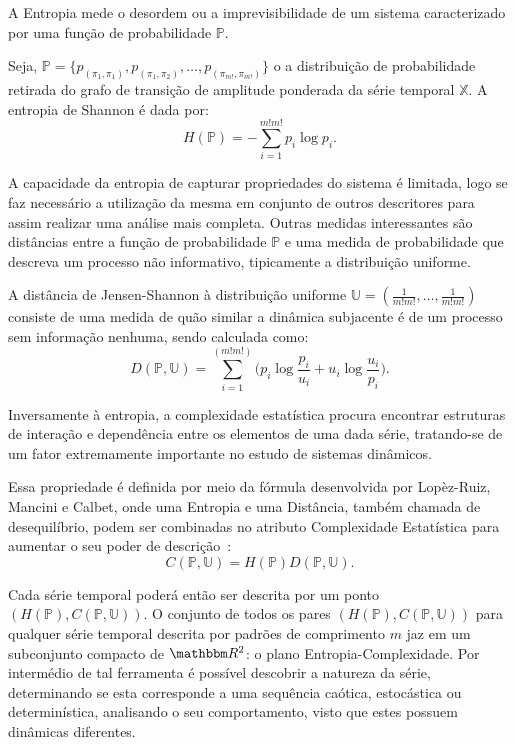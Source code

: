 \documentclass[12pt]{article}
\begin{document}
A Entropia mede o desordem ou a imprevisibilidade de um sistema caracterizado por uma função de probabilidade $\mathbb{P}$.

Seja, $\mathbb{P} = \{p_{(\pi_1, \pi_1)}, p_{(\pi_1, \pi_2)}, \dots, p_{(\pi_{m!}, \pi_{m!})}\}$ o a distribuição de probabilidade retirada do grafo de transição de amplitude ponderada da série temporal $\mathbb{X}$.
A entropia de Shannon é dada por:
\begin{equation}
H(\mathbb{P}) = -\sum_{i=1}^{m!m!} p_i \log p_i .
\label{eq:Entropia}
\end{equation}

A capacidade da entropia de capturar propriedades do sistema é limitada, logo se faz necessário a utilização da mesma em conjunto de outros descritores para assim realizar uma análise mais completa.
Outras medidas interessantes são distâncias entre a função de probabilidade $\mathbb{P}$ e uma medida de probabilidade que descreva um processo não informativo, tipicamente a distribuição uniforme.

A distância de Jensen-Shannon à distribuição uniforme $ \mathbb{U} = (\frac{1}{m!m!},\dots,\frac{1}{m!m!})$ consiste de uma medida de quão similar a dinâmica subjacente é de um processo sem informação nenhuma, sendo calculada como:
\begin{equation}
D(\mathbb{P}, \mathbb{U}) = \sum_{i=1}^{(m!m!)} \Big(p_i \log\frac{p_i}{u_i} +
u_i \log\frac{u_i}{p_i}
\Big).
\end{equation}

Inversamente à entropia, a complexidade estatística procura encontrar estruturas de interação e dependência entre os elementos de uma dada série, tratando-se de um fator extremamente importante no estudo de sistemas dinâmicos.

Essa propriedade é definida por meio da fórmula desenvolvida por Lopèz-Ruiz, Mancini e Calbet, onde uma Entropia e uma Distância, também chamada de desequilíbrio, podem ser combinadas no atributo Complexidade Estatística para aumentar o seu poder de descrição~\citep{Feldman2008information,Feldman1998Statistical,Lopez1995statistical}:
\begin{equation}
C(\mathbb{P}, \mathbb{U}) = H(\mathbb{P}) D(\mathbb{P}, \mathbb{U}).
\end{equation}

Cada série temporal poderá então ser descrita por um ponto $(H(\mathbb{P}), C(\mathbb{P}, \mathbb{U}))$.
O conjunto de todos os pares $(H(\mathbb{P}), C(\mathbb{P}, \mathbb{U}))$ para qualquer série temporal descrita por padrões de comprimento $m$ jaz em um subconjunto compacto de $\mathbbm R^2$: o plano Entropia-Complexidade. 
Por intermédio de tal ferramenta é possível descobrir a natureza da série, determinando se esta corresponde a uma sequência caótica, estocástica ou determinística, analisando o seu comportamento, visto que estes possuem dinâmicas diferentes.
\end{document}
